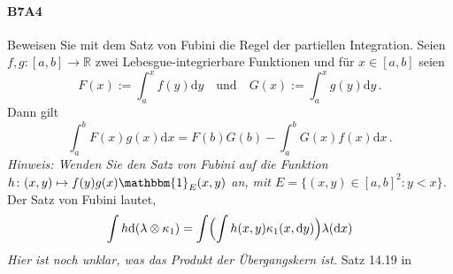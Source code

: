 \documentclass{article}
\begin{document}
\paragraph{B7A4}
Beweisen Sie mit dem Satz von Fubini die Regel der partiellen Integration.
Seien $f,g\colon [a,b]\to\mathbb{R}$ zwei Lebesgue-integrierbare Funktionen und für $x\in[a,b]$ seien
\[
  F(x):=\int_a^xf(y)\mathrm{d}y\quad\text{und}\quad G(x):=\int_a^xg(y)\mathrm{d}y\,.
\]
Dann gilt
\[
  \int_a^bF(x)g(x)\mathrm{d}x=F(b)G(b)-\int_a^bG(x)f(x)\mathrm{d}x\,.
\]
\emph{Hinweis: Wenden Sie den Satz von Fubini auf die Funktion $h\colon (x,y)\mapsto f(y)g(x)\mathbbm{1}_E(x,y)$ an, mit $E=\{(x,y)\in[a,b]^2:y<x\}$.}
Der Satz von Fubini lautet, 
\[
  \int h\mathrm{d}(\lambda\otimes\kappa_1)=\int\Bigl(\int h(x,y)\kappa_1(x,\mathrm{d}y)\Bigr)\lambda(\mathrm{d}x)
\]
\emph{Hier ist noch unklar, was das Produkt der Übergangskern ist.}
Satz 14.19 in \cite{Klenke}
\newpage



\end{document}
